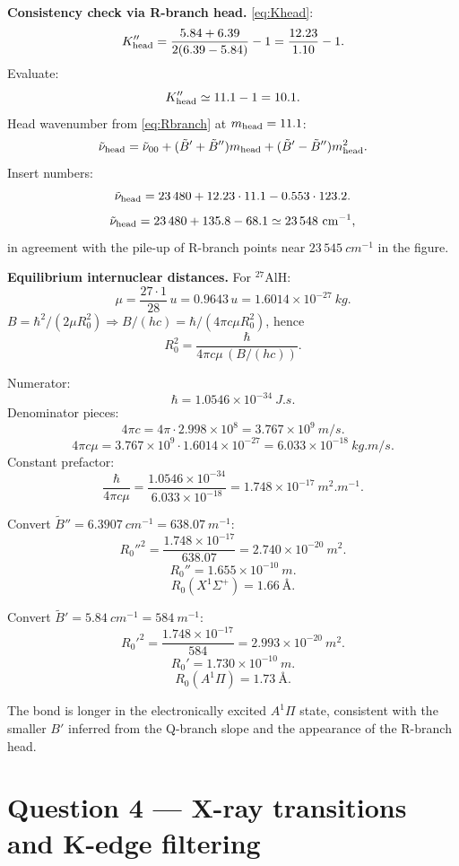 \documentclass[11pt]{article}
\begin{document}
\textbf{Consistency check via R-branch head.} \eqref{eq:Khead}:
\[
K''_{\rm head}=\frac{5.84+6.39}{2(6.39-5.84)}-1=\frac{12.23}{1.10}-1.
\]
Evaluate:
\[
K''_{\rm head}\simeq 11.1-1=10.1.
\]
Head wavenumber from \eqref{eq:Rbranch} at $m_{\rm head}=11.1$:
\[
\tilde\nu_{\rm head}=\tilde\nu_{00}+(\tilde B'+\tilde B'')m_{\rm head}+(\tilde B'-\tilde B'')m_{\rm head}^{2}.
\]
Insert numbers:
\[
\tilde\nu_{\rm head}=23\,480+12.23\cdot 11.1-0.553\cdot 123.2.
\]
\[
\tilde\nu_{\rm head}=23\,480+135.8-68.1\simeq 23\,548\ \si{cm^{-1}},
\]
in agreement with the pile-up of R-branch points near $23\,545\ \si{cm^{-1}}$ in the figure.

\textbf{Equilibrium internuclear distances.} For ${}^{27}$AlH:
\[
\mu=\frac{27\cdot 1}{28}\,\si{u}=0.9643\,\si{u}=1.6014\times 10^{-27}\ \si{kg}.
\]
$B=\hbar^{2}/(2\mu R_{0}^{2})\Rightarrow B/(hc)=\hbar/(4\pi c\mu R_{0}^{2})$, hence
\[
R_{0}^{2}=\frac{\hbar}{4\pi c\mu\,(B/(hc))}.
\]

Numerator:
\[
\hbar=1.0546\times 10^{-34}\ \si{J.s}.
\]
Denominator pieces:
\[
4\pi c=4\pi\cdot 2.998\times 10^{8}=3.767\times 10^{9}\ \si{m/s}.
\]
\[
4\pi c\mu=3.767\times 10^{9}\cdot 1.6014\times 10^{-27}=6.033\times 10^{-18}\ \si{kg.m/s}.
\]
Constant prefactor:
\[
\frac{\hbar}{4\pi c\mu}=\frac{1.0546\times 10^{-34}}{6.033\times 10^{-18}}=1.748\times 10^{-17}\ \si{m^{2}.m^{-1}}.
\]

Convert $\tilde B''=6.3907\ \si{cm^{-1}}=638.07\ \si{m^{-1}}$:
\[
R_{0}''^{2}=\frac{1.748\times 10^{-17}}{638.07}=2.740\times 10^{-20}\ \si{m^{2}}.
\]
\[
R_{0}''=1.655\times 10^{-10}\ \si{m}.
\]
\[
\boxed{\;R_{0}(X^{1}\!\Sigma^{+})=1.66\ \si{\angstrom}.\;}
\]

Convert $\tilde B'=5.84\ \si{cm^{-1}}=584\ \si{m^{-1}}$:
\[
R_{0}'^{2}=\frac{1.748\times 10^{-17}}{584}=2.993\times 10^{-20}\ \si{m^{2}}.
\]
\[
R_{0}'=1.730\times 10^{-10}\ \si{m}.
\]
\[
\boxed{\;R_{0}(A^{1}\!\Pi)=1.73\ \si{\angstrom}.\;}
\]

The bond is longer in the electronically excited $A^{1}\!\Pi$ state, consistent with the smaller $B'$ inferred from the Q-branch slope and the appearance of the R-branch head.

\section*{Question 4 --- X-ray transitions and K-edge filtering}
\end{document}
